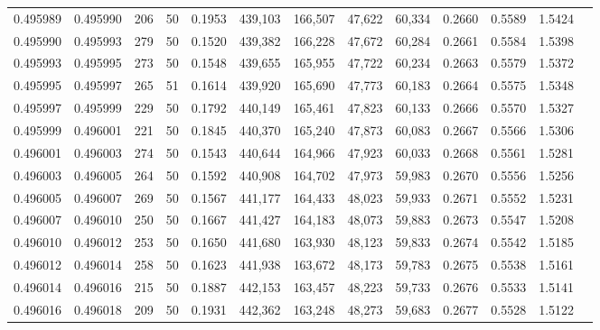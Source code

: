 \begin{tabular}{rrrrrrrrrrrrr}
0.495989 & 0.495990 &   206 &  50 &                                     0.1953 & 439,103 & 166,507 &  47,622 &  60,334 & 0.2660 & 0.5589 & 1.5424 \\
0.495990 & 0.495993 &   279 &  50 &                                     0.1520 & 439,382 & 166,228 &  47,672 &  60,284 & 0.2661 & 0.5584 & 1.5398 \\
0.495993 & 0.495995 &   273 &  50 &                                     0.1548 & 439,655 & 165,955 &  47,722 &  60,234 & 0.2663 & 0.5579 & 1.5372 \\
0.495995 & 0.495997 &   265 &  51 &                                     0.1614 & 439,920 & 165,690 &  47,773 &  60,183 & 0.2664 & 0.5575 & 1.5348 \\
0.495997 & 0.495999 &   229 &  50 &                                     0.1792 & 440,149 & 165,461 &  47,823 &  60,133 & 0.2666 & 0.5570 & 1.5327 \\
0.495999 & 0.496001 &   221 &  50 &                                     0.1845 & 440,370 & 165,240 &  47,873 &  60,083 & 0.2667 & 0.5566 & 1.5306 \\
0.496001 & 0.496003 &   274 &  50 &                                     0.1543 & 440,644 & 164,966 &  47,923 &  60,033 & 0.2668 & 0.5561 & 1.5281 \\
0.496003 & 0.496005 &   264 &  50 &                                     0.1592 & 440,908 & 164,702 &  47,973 &  59,983 & 0.2670 & 0.5556 & 1.5256 \\
0.496005 & 0.496007 &   269 &  50 &                                     0.1567 & 441,177 & 164,433 &  48,023 &  59,933 & 0.2671 & 0.5552 & 1.5231 \\
0.496007 & 0.496010 &   250 &  50 &                                     0.1667 & 441,427 & 164,183 &  48,073 &  59,883 & 0.2673 & 0.5547 & 1.5208 \\
0.496010 & 0.496012 &   253 &  50 &                                     0.1650 & 441,680 & 163,930 &  48,123 &  59,833 & 0.2674 & 0.5542 & 1.5185 \\
0.496012 & 0.496014 &   258 &  50 &                                     0.1623 & 441,938 & 163,672 &  48,173 &  59,783 & 0.2675 & 0.5538 & 1.5161 \\
0.496014 & 0.496016 &   215 &  50 &                                     0.1887 & 442,153 & 163,457 &  48,223 &  59,733 & 0.2676 & 0.5533 & 1.5141 \\
0.496016 & 0.496018 &   209 &  50 &                                     0.1931 & 442,362 & 163,248 &  48,273 &  59,683 & 0.2677 & 0.5528 & 1.5122 \\

\end{tabular}
